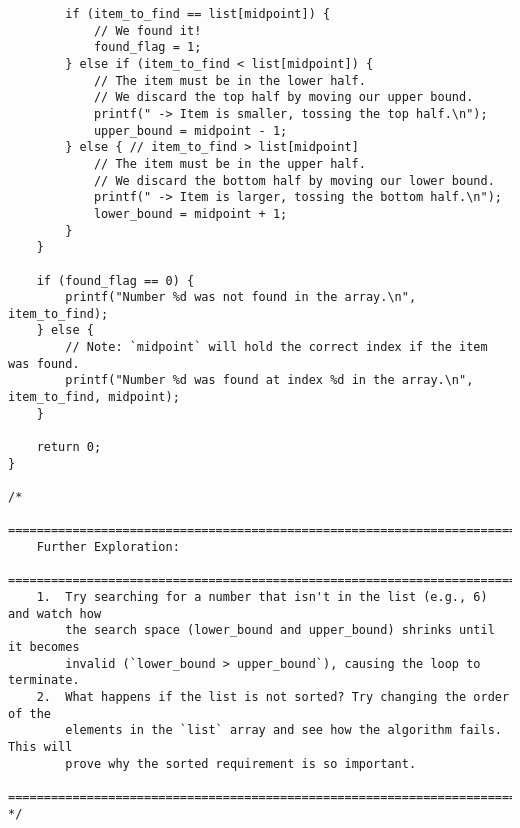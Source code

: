 \documentclass[11pt]{book}
\begin{document}
\begin{verbatim}
        if (item_to_find == list[midpoint]) {
            // We found it!
            found_flag = 1;
        } else if (item_to_find < list[midpoint]) {
            // The item must be in the lower half.
            // We discard the top half by moving our upper bound.
            printf(" -> Item is smaller, tossing the top half.\n");
            upper_bound = midpoint - 1;
        } else { // item_to_find > list[midpoint]
            // The item must be in the upper half.
            // We discard the bottom half by moving our lower bound.
            printf(" -> Item is larger, tossing the bottom half.\n");
            lower_bound = midpoint + 1;
        }
    }

    if (found_flag == 0) {
        printf("Number %d was not found in the array.\n", item_to_find);
    } else {
        // Note: `midpoint` will hold the correct index if the item was found.
        printf("Number %d was found at index %d in the array.\n", item_to_find, midpoint);
    }

    return 0;
}

/*
    ================================================================================
    Further Exploration:
    ================================================================================
    1.  Try searching for a number that isn't in the list (e.g., 6) and watch how
        the search space (lower_bound and upper_bound) shrinks until it becomes
        invalid (`lower_bound > upper_bound`), causing the loop to terminate.
    2.  What happens if the list is not sorted? Try changing the order of the
        elements in the `list` array and see how the algorithm fails. This will
        prove why the sorted requirement is so important.
    ================================================================================
*/

\end{verbatim}
\clearpage
\end{document}
